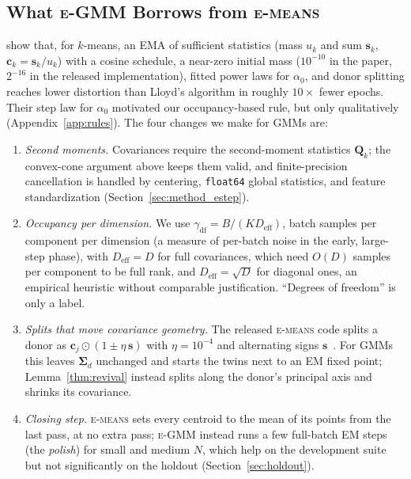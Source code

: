 \documentclass[10pt]{article} %
\newcommand{\egmm}{\textsc{e-GMM}}
\newcommand{\emeans}{\textsc{e-means}}
\begin{document}
\subsection{What \egmm{} Borrows from \emeans{}}
\label{sec:emeans_compare}
\citet{bessa2026emeans} show that, for $k$-means, an EMA of sufficient statistics (mass $u_k$ and sum $\mathbf{s}_k$, $\mathbf{c}_k = \mathbf{s}_k / u_k$) with a cosine schedule, a near-zero initial mass ($10^{-10}$ in the paper, $2^{-16}$ in the released implementation), fitted power laws for $\alpha_0$, and donor splitting reaches lower distortion than Lloyd's algorithm in roughly $10\times$ fewer epochs. Their step law for $\alpha_0$ motivated our occupancy-based rule, but only qualitatively (Appendix~\ref{app:rules}). The four changes we make for GMMs are:
\begin{enumerate}[leftmargin=*,nosep]
  \item \emph{Second moments.} Covariances require the second-moment statistics $\mathbf{Q}_k$; the convex-cone argument above keeps them valid, and finite-precision cancellation is handled by centering, \texttt{float64} global statistics, and feature standardization (Section~\ref{sec:method_estep}).
  \item \emph{Occupancy per dimension.} We use $\gamma_{\mathrm{df}} = B/(K D_{\mathrm{eff}})$, batch samples per component per dimension (a measure of per-batch noise in the early, large-step phase), with $D_{\mathrm{eff}} = D$ for full covariances, which need $O(D)$ samples per component to be full rank, and $D_{\mathrm{eff}} = \sqrt{D}$ for diagonal ones, an empirical heuristic without comparable justification. ``Degrees of freedom'' is only a label.
  \item \emph{Splits that move covariance geometry.} The released \emeans{} code splits a donor as $\mathbf{c}_j \odot (1 \pm \eta\, \mathbf{s})$ with $\eta = 10^{-4}$ and alternating signs $\mathbf{s}$~\citep{linde1980algorithm}. For GMMs this leaves $\boldsymbol{\Sigma}_d$ unchanged and starts the twins next to an EM fixed point; Lemma~\ref{thm:revival} instead splits along the donor's principal axis and shrinks its covariance.
  \item \emph{Closing step.} \emeans{} sets every centroid to the mean of its points from the last pass, at no extra pass; \egmm{} instead runs a few full-batch EM steps (the \emph{polish}) for small and medium $N$, which help on the development suite but not significantly on the holdout (Section~\ref{sec:holdout}).
\end{enumerate}
\end{document}
